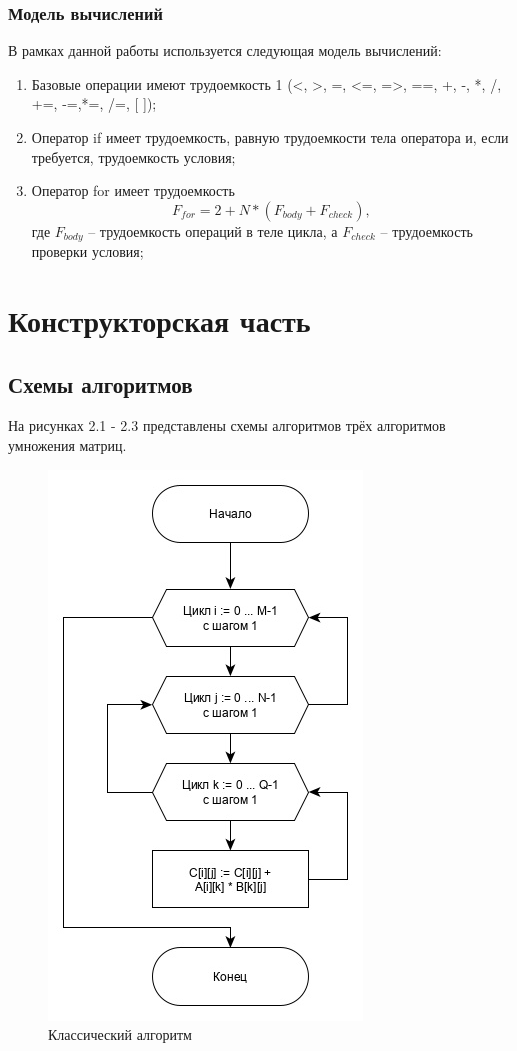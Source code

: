\documentclass[12pt, a4paper]{report}
\begin{document}
	\subsection{Модель вычислений}
	В рамках данной работы используется следующая модель вычислений:\\
	\begin{enumerate}
		\item Базовые операции имеют трудоемкость 1 (<, >, =, <=, =>, ==, +, -, *, /, +=, -=,*=, /=,  [ ]);
		\item Оператор if имеет трудоемкость, равную трудоемкости тела оператора и, если требуется, трудоемкость условия;
		\item Оператор for имеет трудоемкость
		\begin{equation}
		F_{for} = 2 + N \ast (F_{body} + F_{check}),
		\end{equation}
		где $F_{body}$ -- трудоемкость операций в теле цикла, а $F_{check}$ -- трудоемкость проверки условия;
	\end{enumerate}
	

	\chapter{Конструкторская часть}
	
	\section{Схемы алгоритмов}
	На рисунках 2.1 - 2.3 представлены схемы алгоритмов трёх алгоритмов умножения матриц.
	\begin{figure}[ht!]
		\centering
		\includegraphics[scale=0.8]{classic.jpg}
		\caption{Классический алгоритм}
		\label{fig:clasic}
	\end{figure}
\end{document}
